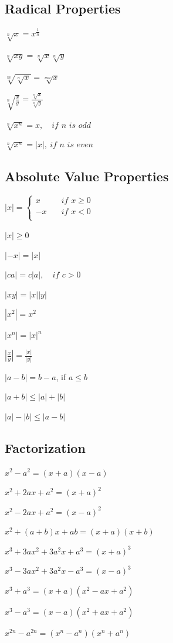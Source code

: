 \documentclass[8pt,a4paper]{extarticle}     %
\theoremstyle{definition}
\theoremstyle{definition}
\theoremstyle{definition}
\begin{document}
\begin{multicols}{4}
\subsection{Radical Properties}
\begin{eqlist}
	\item $\sqrt[n]{x} = x^{\frac{1}{n}}$
	\item $\sqrt[n]{xy} = \sqrt[n]{x}\sqrt[n]{y}$
	\item $\sqrt[m]{\sqrt[n]{x}} = \sqrt[mn]{x}$
	\item $\sqrt[n]{\frac{x}{y}} = \frac{\sqrt[n]{x}}{\sqrt[n]{y}}$
	\item $\sqrt[n]{x^n} = x, \quad \textit{if $n$ is odd}$
	\item $\sqrt[n]{x^n} = |x|, \ \textit{if $n$ is even}$
\end{eqlist}

\subsection{Absolute Value Properties}
\begin{eqlist}
	\item $|x| = \begin{cases}
			x &\quad \textit{if $x \geq 0$}\\
			-x &\quad \textit{if $x < 0$}\\
		\end{cases} $
	\item $|x| \geq 0$
	\item $|-x| = |x|$
	\item $|ca| = c|a|, \quad \textit{if $c > 0$}$
	\item $|xy| = |x||y|$
	\item $|x^2| = x^2$
	\item $|x^n| = |x|^n$
	\item $\left|\frac{x}{y}\right| = \frac{|x|}{|y|}$
	\item $|a-b| = b-a$, if $a\leq b$
	\item $|a+b| \leq |a| + |b|$
	\item $|a|-|b| \leq |a-b|$
\end{eqlist}

\subsection{Factorization}
\begin{eqlist}
	\item $x^2-a^2 = (x+a)(x-a)$
	\item $x^2+2ax+a^2 = (x+a)^2$
	\item $x^2-2ax+a^2 = (x-a)^2$
	\item $x^2+(a+b)x+ab = (x+a)(x+b)$
	\item $x^3+3ax^2+3a^2x+a^3 = (x+a)^3$
	\item $x^3-3ax^2+3a^2x-a^3 = (x-a)^3$
	\item $x^3+a^3=(x+a)(x^2-ax+a^2)$
	\item $x^3-a^3=(x-a)(x^2+ax+a^2)$
	\item $x^{2n}-a^{2n}=(x^n-a^n)(x^n+a^n)$
\end{eqlist}


\end{multicols}
\end{document}
